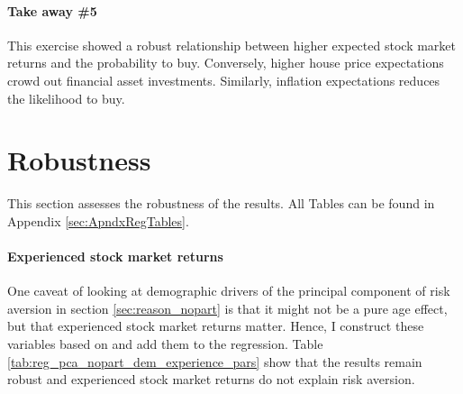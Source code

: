 \documentclass[ProjectABM]{subfiles}
\begin{document}




\paragraph{Take away \#5}
This exercise showed a robust relationship between higher expected stock market returns and the probability to buy. Conversely, higher house price expectations crowd out financial asset investments. Similarly, inflation expectations reduces the likelihood to buy.

\section{Robustness}\label{sec:robustness}
This section assesses the robustness of the results. All Tables can be found in Appendix \ref{sec:ApndxRegTables}.

\paragraph{Experienced stock market returns}
One caveat of looking at demographic drivers of the principal component of risk aversion in section \ref{sec:reason_nopart} is that it might not be a pure age effect, but that experienced stock market returns matter. Hence, I construct these variables based on \cite{malmendier_2011} and add them to the regression.
Table \ref{tab:reg_pca_nopart_dem_experience_pars} %
show that the results remain robust and experienced stock market returns do not explain risk aversion.%
\end{document}
